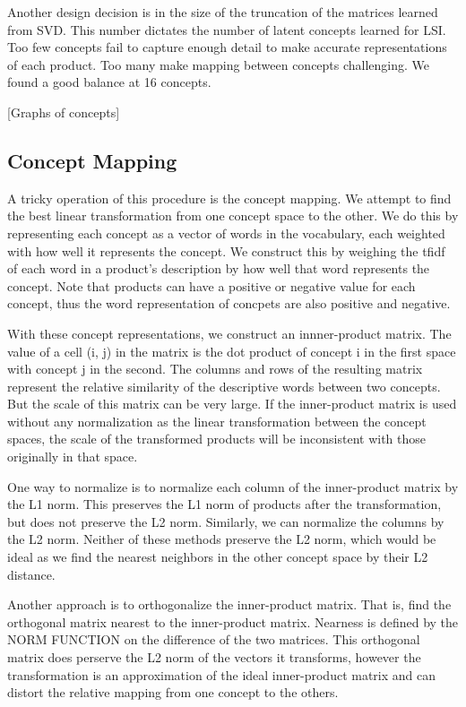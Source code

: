 \documentclass[11pt]{article}
\begin{document}
Another design decision is in the size of the truncation of the matrices learned
from SVD. This number dictates the number of latent concepts learned for LSI.
Too few concepts fail to capture enough detail to make accurate representations
of each product. Too many make mapping between concepts challenging. We found a
good balance at 16 concepts. 

[Graphs of concepts]

\subsection*{Concept Mapping}
A tricky operation of this procedure is the concept mapping. We attempt to find
the best linear transformation from one concept space to the other. We do this
by representing each concept as a vector of words in the vocabulary, each
weighted with how well it represents the concept. We construct this by weighing
the tfidf of each word in a product's description by how well that word
represents the concept. Note that products can have a positive or negative value
for each concept, thus the word representation of concpets are also positive and
negative. 

With these concept representations, we construct an innner-product matrix. The 
value of a cell (i, j) in the matrix is the dot product of concept i in the first 
space with concept j in the second. The columns and rows of the resulting matrix
represent the relative similarity of the descriptive words between two concepts.
But the scale of this matrix can be very large. If the inner-product matrix is
used without any normalization as the linear transformation between the concept
spaces, the scale of the transformed products will be inconsistent with those
originally in that space. 

One way to normalize is to normalize each column of the inner-product matrix by
the L1 norm. This preserves the L1 norm of products after the transformation,
but does not preserve the L2 norm. Similarly, we can normalize the columns by
the L2 norm. Neither of these methods preserve the L2 norm, which would be ideal
as we find the nearest neighbors in the other concept space by their L2
distance.

Another approach is to orthogonalize the inner-product matrix. That is, find the
orthogonal matrix nearest to the inner-product matrix. Nearness is defined by
the NORM FUNCTION on the difference of the two matrices. This orthogonal matrix
does perserve the L2 norm of the vectors it transforms, however the
transformation is an approximation of the ideal inner-product matrix and can
distort the relative mapping from one concept to the others.
\end{document}
